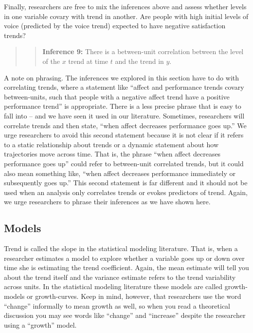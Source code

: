 \documentclass[english,,man]{apa6}
\theoremstyle{definition}
\theoremstyle{definition}
\theoremstyle{definition}
\theoremstyle{remark}
\begin{document}
Finally, researchers are free to mix the inferences above and assess
whether levels in one variable covary with trend in another. Are people
with high initial levels of voice (predicted by the voice trend)
expected to have negative satisfaction trends?

\begin{quote}
\begin{quote}
\textbf{Inference 9:} There is a between-unit correlation between the
level of the \(x\) trend at time \(t\) and the trend in \(y\).
\end{quote}
\end{quote}

A note on phrasing. The inferences we explored in this section have to
do with correlating trends, where a statement like \enquote{affect and
performance trends covary between-units, such that people with a
negative affect trend have a positive performance trend} is appropriate.
There is a less precise phrase that is easy to fall into -- and we have
seen it used in our literature. Sometimes, researchers will correlate
trends and then state, \enquote{when affect decreases performance goes
up.} We urge researchers to avoid this second statement because it is
not clear if it refers to a static relationship about trends or a
dynamic statement about how trajectories move across time. That is, the
phrase \enquote{when affect decreases performance goes up} could refer
to between-unit correlated trends, but it could also mean something
like, \enquote{when affect decreases performance immediately or
subsequently goes up.} This second statement is far different and it
should not be used when an analysis only correlates trends or evokes
predictors of trend. Again, we urge researchers to phrase their
inferences as we have shown here.

\hypertarget{models}{%
\subsection{Models}\label{models}}

Trend is called the slope in the statistical modeling literature. That
is, when a researcher estimates a model to explore whether a variable
goes up or down over time she is estimating the trend coefficient.
Again, the mean estimate will tell you about the trend itself and the
variance estimate refers to the trend variability across units. In the
statistical modeling literature these models are called growth-models or
growth-curves. Keep in mind, however, that researchers use the word
\enquote{change} informally to mean growth as well, so when you read a
theoretical discussion you may see words like \enquote{change} and
\enquote{increase} despite the researcher using a \enquote{growth}
model.
\end{document}
